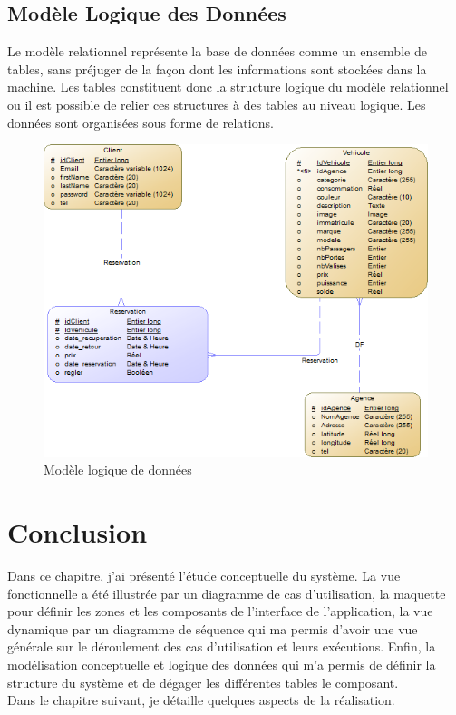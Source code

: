 \documentclass[12pt,a4paper]{report}
\begin{document}
			\subsection{Modèle Logique des Données}
Le modèle relationnel représente la base de données comme un ensemble de tables, sans préjuger de la façon dont les informations sont stockées dans la machine. Les tables constituent donc la structure logique du modèle relationnel ou il est possible de relier ces structures à des tables au niveau logique. Les données sont organisées sous forme de relations.
			\begin{figure}[!hbtp]
				\centering
				\includegraphics[scale=0.8]{./graphics/mld.png}
				\caption{Modèle logique de données}
			\end{figure}
			
		
		\section{Conclusion}
Dans ce chapitre, j'ai présenté l'étude conceptuelle du système. La vue fonctionnelle a été illustrée par un diagramme de cas d’utilisation, la maquette pour définir les zones et les composants de l’interface de l'application, la vue dynamique par un diagramme de séquence qui ma permis d'avoir une vue générale sur le déroulement des cas d'utilisation et leurs exécutions. Enfin, la modélisation conceptuelle et logique des données qui m'a permis de définir la structure du système et de dégager les différentes tables le composant.\\
Dans le chapitre suivant, je détaille quelques aspects de la réalisation.	
	
\end{document}
